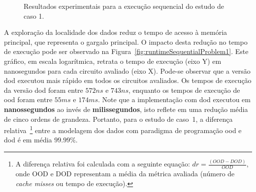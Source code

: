 \begin{figure}
    \centering
    \caption{Resultados experimentais para a execução sequencial do estudo de caso 1.}
    \label{fig:problem1resultSequencial}
\end{figure}


A exploração da localidade dos dados reduz o tempo de acesso à memória principal, que representa o gargalo principal.  O impacto desta redução no tempo de execução pode ser observado na Figura~\ref{fig:runtimeSequentialProblem1}. Este gráfico, em escala logarítmica, retrata o tempo de execução (eixo Y) em nanosegundos para cada circuito avaliado (eixo X). Pode-se observar que a versão \ac{dod} executou mais rápido em todos os circuitos avaliados. Os tempos de execução da versão \ac{dod} foram entre $572ns$ e $743ns$, enquanto os tempos de execução de \ac{ood} foram entre $55ms$ e $174ms$.
Note que a implementação com \ac{dod} executou em \textbf{nanossegundos} ao invés de \textbf{milissegundos}, isto reflete em uma redução média de cinco ordens de grandeza.
Portanto, para o estudo de caso~1, a diferença relativa~\footnote{A diferença relativa foi calculada com a seguinte equação: $dr = \frac{(OOD - DOD)}{OOD}$, onde OOD e DOD representam a média da métrica avaliada (número de  \textit{cache misses} ou tempo de execução).} entre a modelagem dos dados com paradigma de programação \ac{ood} e \ac{dod} é em média $99.99\%$.

